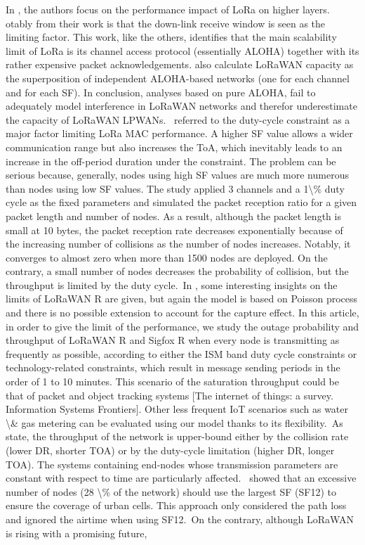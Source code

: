  \cite{adelantado_understanding_2017}   In \cite{adelantado_understanding_2017}, the authors focus on the performance impact of LoRa on higher layers. otably from their work is that the down-link receive window is seen as the limiting factor. This work, like the others, identifies that the main scalability limit of LoRa is its channel access protocol (essentially ALOHA) together with its rather expensive packet acknowledgements.\citet{adelantado_understanding_2017} also calculate LoRaWAN capacity as the superposition of independent ALOHA-based networks (one for each channel and for each SF). In conclusion, analyses based on pure ALOHA, fail to adequately model interference in LoRaWAN networks and therefor underestimate the capacity of LoRaWAN LPWANs.~\citet{adelantado_understanding_2017} referred to the duty-cycle constraint as a major factor limiting LoRa MAC performance. A higher SF value allows a wider communication range but also increases the ToA, which inevitably leads to an increase in the off-period duration under the constraint. The problem can be serious because, generally, nodes using high SF values are much more numerous than nodes using low SF values. The study applied 3 channels and a 1\textbackslash\% duty cycle as the fixed parameters and simulated the packet reception ratio for a given packet length and number of nodes. As a result, although the packet length is small at 10 bytes, the packet reception rate decreases exponentially because of the increasing number of collisions as the number of nodes increases. Notably, it converges to almost zero when more than 1500 nodes are deployed. On the contrary, a small number of nodes decreases the probability of collision, but the throughput is limited by the duty cycle.~In \cite{adelantado_understanding_2017}, some interesting insights on the limits of LoRaWAN R are given, but again the model is based on Poisson process and there is no possible extension to account for the capture effect. In this article, in order to give the limit of the performance, we study the outage probability and throughput of LoRaWAN R and Sigfox R when every node is transmitting as frequently as possible, according to either the ISM band duty cycle constraints or technology-related constraints, which result in message sending periods in the order of 1 to 10 minutes. This scenario of the saturation throughput could be that of packet and object tracking systems [The internet of things: a survey. Information Systems Frontiers]. Other less frequent IoT scenarios such as water \textbackslash\& gas metering can be evaluated using our model thanks to its flexibility.~As \citet{adelantado_understanding_2017} state, the throughput of the network is upper-bound either by the collision rate (lower DR, shorter TOA) or by the duty-cycle limitation (higher DR, longer TOA). The systems containing end-nodes whose transmission parameters are constant with respect to time are particularly affected.~\citet{adelantado_understanding_2017} showed that an excessive number of nodes (28 \textbackslash\% of the network) should use the largest SF (SF12) to ensure the coverage of urban cells. This approach only considered the path loss and ignored the airtime when using SF12.~On the contrary, although LoRaWAN is rising with a promising future, 